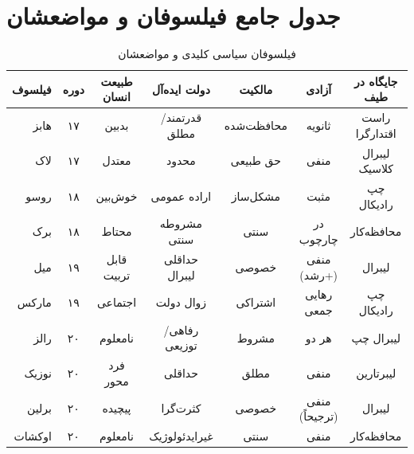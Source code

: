 \vspace{-10pt}

\section*{جدول جامع فیلسوفان و مواضعشان}

\vspace{-8pt}

\begin{table}[H]
	\centering
	\caption{فیلسوفان سیاسی کلیدی و مواضعشان}
	\label{tab:philosophers-summary}
	\small
	\setlength{\tabcolsep}{3pt}
	\begin{tabular}{r|c|c|c|c|c|c}
		\toprule
		\textbf{فیلسوف} & \textbf{دوره} & \textbf{طبیعت انسان} & \textbf{دولت ایده‌آل} & \textbf{مالکیت} & \textbf{آزادی} & \textbf{جایگاه در طیف} \\
		\midrule
		هابز & ۱۷ & بدبین & قدرتمند/مطلق & محافظت‌شده & ثانویه & راست اقتدارگرا \\
		\midrule
		لاک & ۱۷ & معتدل & محدود & حق طبیعی & منفی & لیبرال کلاسیک \\
		\midrule
		روسو & ۱۸ & خوش‌بین & اراده عمومی & مشکل‌ساز & مثبت & چپ رادیکال \\
		\midrule
		برک & ۱۸ & محتاط & مشروطه سنتی & سنتی & در چارچوب & محافظه‌کار \\
		\midrule
		میل & ۱۹ & قابل تربیت & حداقلی لیبرال & خصوصی & منفی (+رشد) & لیبرال \\
		\midrule
		مارکس & ۱۹ & اجتماعی & زوال دولت & اشتراکی & رهایی جمعی & چپ رادیکال \\
		\midrule
		رالز & ۲۰ & نامعلوم & رفاهی/توزیعی & مشروط & هر دو & لیبرال چپ \\
		\midrule
		نوزیک & ۲۰ & فرد محور & حداقلی & مطلق & منفی & لیبرتارین \\
		\midrule
		برلین & ۲۰ & پیچیده & کثرت‌گرا & خصوصی & منفی (ترجیحاً) & لیبرال \\
		\midrule
		اوکشات & ۲۰ & نامعلوم & غیرایدئولوژیک & سنتی & منفی & محافظه‌کار \\
		\bottomrule
	\end{tabular}
\end{table}


